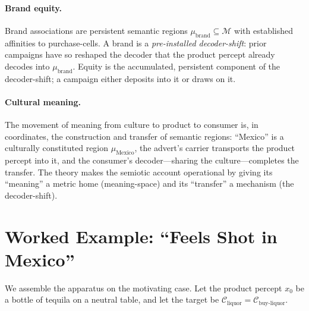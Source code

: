\documentclass[twocolumn,11pt,a4paper]{article}
\theoremstyle{adv}
\theoremstyle{definition}
\theoremstyle{remark}
\newcommand{\Cell}{\mathcal{C}}        %
\newcommand{\Mean}{\mathcal{M}}        %
\begin{document}
\paragraph{Brand equity.}
Brand associations \citep{aaker1991,keller1993} are persistent semantic
regions $\mu_{\text{brand}}\subseteq\Mean$ with established affinities to
purchase-cells. A brand is a \emph{pre-installed decoder-shift}: prior
campaigns have so reshaped the decoder that the product percept already
decodes into $\mu_{\text{brand}}$. Equity is the accumulated, persistent
component of the decoder-shift; a campaign either deposits into it or draws
on it.

\paragraph{Cultural meaning.}
The movement of meaning from culture to product to consumer
\citep{mccracken1988,mick1986,barthes1977} is, in coordinates, the
construction and transfer of semantic regions: ``Mexico'' is a culturally
constituted region $\mu_{\text{Mexico}}$, the advert's carrier transports
the product percept into it, and the consumer's decoder---sharing the
culture---completes the transfer. The theory makes the semiotic account
operational by giving its ``meaning'' a metric home (meaning-space) and its
``transfer'' a mechanism (the decoder-shift).

\section{Worked Example: ``Feels Shot in Mexico''}
\label{sec:example}

We assemble the apparatus on the motivating case. Let the product percept
$x_0$ be a bottle of tequila on a neutral table, and let the target be
$\Cell_{\text{liquor}}=\Cell_{\text{buy-liquor}}$.
\end{document}
